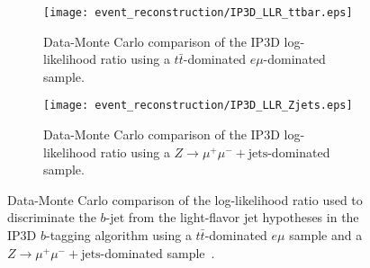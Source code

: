 \begin{figure}[htbp]
 \centering
 \begin{subfigure}[t]{0.48\textwidth}
  \centering
  \texttt{[image: event\_reconstruction/IP3D\_LLR\_ttbar.eps]}
  \caption[Data-Monte Carlo comparison of the IP3D log-likelihood ratio using a $t\bar{t}$-dominated $e\mu$ sample.]{%
   Data-Monte Carlo comparison of the IP3D log-likelihood ratio using a $t\bar{t}$-dominated $e\mu$-dominated sample.}
  \label{fig:IP3D_LLR_ttbar}
 \end{subfigure}%
 \quad
 \begin{subfigure}[t]{0.48\textwidth}
  \centering
  \texttt{[image: event\_reconstruction/IP3D\_LLR\_Zjets.eps]}
  \caption[Data-Monte Carlo comparison of the IP3D log-likelihood ratio using a $Z\to \mu^{+}\mu^{-}+\textrm{jets}$-dominated sample.]{%
   Data-Monte Carlo comparison of the IP3D log-likelihood ratio using a $Z\to \mu^{+}\mu^{-}+\textrm{jets}$-dominated sample.}
  \label{fig:IP3D_LLR_Zjets}
 \end{subfigure}%
 \caption[Data-Monte Carlo comparison of the log-likelihood ratio used to discriminate the $b$-jet from the light-flavor jet hypotheses in the IP3D $b$-tagging algorithm using different samples.]{%
  Data-Monte Carlo comparison of the log-likelihood ratio used to discriminate the $b$-jet from the light-flavor jet hypotheses in the IP3D $b$-tagging algorithm using a $t\bar{t}$-dominated $e\mu$ sample and a ${Z\to \mu^{+}\mu^{-}+\textrm{jets}}$-dominated sample~\cite{ATL-PHYS-PUB-2017-013}.}
 \label{fig:IP3D_LLR}
\end{figure}

